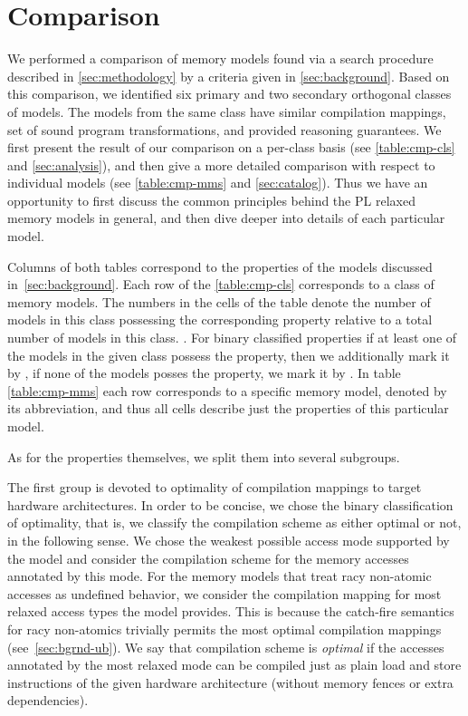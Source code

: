 \section{Comparison}

We performed a comparison of memory models 
found via a search procedure described in \cref{sec:methodology} 
by a criteria given in \cref{sec:background}. 
Based on this comparison, we identified six primary 
and two secondary orthogonal classes of models.
The models from the same class have similar compilation mappings, 
set of sound program transformations, and provided reasoning guarantees.
We first present the result of our comparison on a per-class basis 
(see \cref{table:cmp-cls} and \cref{sec:analysis}), and 
then give a more detailed comparison with respect to individual models
(see \cref{table:cmp-mms} and \cref{sec:catalog}).
Thus we have an opportunity to first discuss the common principles
behind the PL relaxed memory models in general, and then dive deeper 
into details of each particular model.  

Columns of both tables correspond to the properties 
of the models discussed in~\cref{sec:background}.
Each row of the \cref{table:cmp-cls} corresponds to a class of memory models.
The numbers in the cells of the table denote the number of models in this 
class possessing the corresponding property relative to a total number 
of models in this class. .
For binary classified properties if at least one of the models 
in the given class possess the property,
then we additionally mark it by \cmark, 
if none of the models posses the property, we mark it by \xmark.    
In table \cref{table:cmp-mms} each row corresponds to 
a specific memory model, denoted by its abbreviation, 
and thus all cells describe just the properties 
of this particular model. 

As for the properties themselves, we split them into several subgroups.

The first group is devoted to optimality of compilation mappings
to target hardware architectures. In order to be concise, 
we chose the binary classification of optimality, 
that is, we classify the compilation scheme as either optimal or not,
in the following sense.
We chose the weakest possible access mode supported by the model
and consider the compilation scheme for the memory accesses annotated by this mode. 
For the memory models that treat racy non-atomic accesses
as undefined behavior, we consider the compilation mapping
for most relaxed access types the model provides.
This is because the catch-fire semantics for racy non-atomics 
trivially permits the most optimal compilation mappings (see~\cref{sec:bgrnd-ub}).
We say that compilation scheme is \emph{optimal} if the 
accesses annotated by the most relaxed mode 
can be compiled just as plain load and store instructions 
of the given hardware architecture (\ie without memory fences or extra dependencies). 

